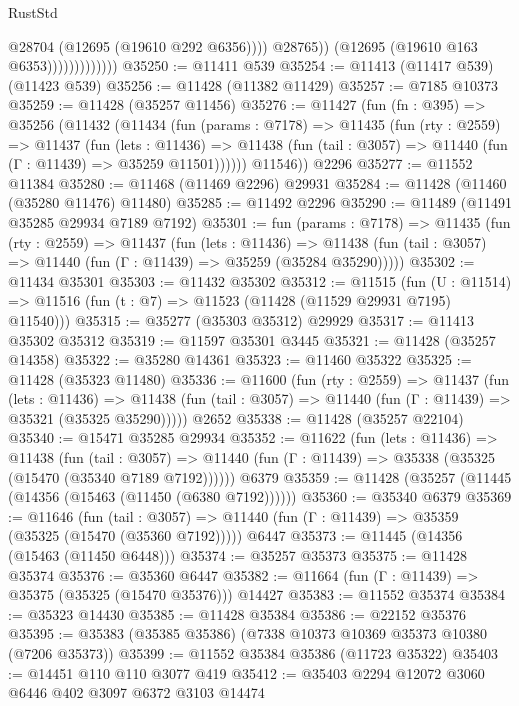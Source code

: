 \begin{lexlean}{RustStd}
\begin{coremodule}
                                  @28704
                                  (@12695 (@19610 @292 @6356))))
                              @28765))
                          (@12695 (@19610 @163 @6353)))))))))))))
@35250 := @11411 @539
@35254 := @11413 (@11417 @539) (@11423 @539)
@35256 := @11428 (@11382 @11429)
@35257 := @7185 @10373
@35259 := @11428 (@35257 @11456)
@35276 := @11427
    (fun (fn : @395) =>
    @35256
      (@11432
        (@11434
          (fun (params : @7178) =>
          @11435
            (fun (rty : @2559) =>
            @11437
              (fun (lets : @11436) =>
              @11438 (fun (tail : @3057) => @11440 (fun (Γ : @11439) => @35259 @11501))))))
        @11546))
    @2296
@35277 := @11552 @11384
@35280 := @11468 (@11469 @2296) @29931
@35284 := @11428 (@11460 (@35280 @11476) @11480)
@35285 := @11492 @2296
@35290 := @11489 (@11491 @35285 @29934 @7189 @7192)
@35301 := fun (params : @7178) =>
  @11435
    (fun (rty : @2559) =>
    @11437
      (fun (lets : @11436) =>
      @11438 (fun (tail : @3057) => @11440 (fun (Γ : @11439) => @35259 (@35284 @35290)))))
@35302 := @11434 @35301
@35303 := @11432 @35302
@35312 := @11515
    (fun (U : @11514) => @11516 (fun (t : @7) => @11523 (@11428 (@11529 @29931 @7195) @11540)))
@35315 := @35277 (@35303 @35312) @29929
@35317 := @11413 @35302 @35312
@35319 := @11597 @35301 @3445
@35321 := @11428 (@35257 @14358)
@35322 := @35280 @14361
@35323 := @11460 @35322
@35325 := @11428 (@35323 @11480)
@35336 := @11600
    (fun (rty : @2559) =>
    @11437
      (fun (lets : @11436) =>
      @11438 (fun (tail : @3057) => @11440 (fun (Γ : @11439) => @35321 (@35325 @35290)))))
    @2652
@35338 := @11428 (@35257 @22104)
@35340 := @15471 @35285 @29934
@35352 := @11622
    (fun (lets : @11436) =>
    @11438
      (fun (tail : @3057) =>
      @11440 (fun (Γ : @11439) => @35338 (@35325 (@15470 (@35340 @7189 @7192))))))
    @6379
@35359 := @11428 (@35257 (@11445 (@14356 (@15463 (@11450 (@6380 @7192))))))
@35360 := @35340 @6379
@35369 := @11646
    (fun (tail : @3057) => @11440 (fun (Γ : @11439) => @35359 (@35325 (@15470 (@35360 @7192)))))
    @6447
@35373 := @11445 (@14356 (@15463 (@11450 @6448)))
@35374 := @35257 @35373
@35375 := @11428 @35374
@35376 := @35360 @6447
@35382 := @11664 (fun (Γ : @11439) => @35375 (@35325 (@15470 @35376))) @14427
@35383 := @11552 @35374
@35384 := @35323 @14430
@35385 := @11428 @35384
@35386 := @22152 @35376
@35395 := @35383 (@35385 @35386) (@7338 @10373 @10369 @35373 @10380 (@7206 @35373))
@35399 := @11552 @35384 @35386 (@11723 @35322)
@35403 := @14451 @110 @110 @3077 @419
@35412 := @35403 @2294 @12072 @3060 @6446 @402 @3097 @6372 @3103 @14474

\end{coremodule}
\end{lexlean}
